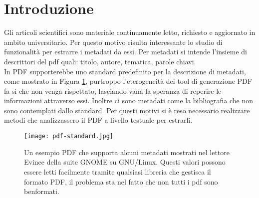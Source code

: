 \section{Introduzione}\label{intro}

Gli articoli scientifici sono materiale continuamente letto, richiesto e aggiornato in ambito universitario. Per questo motivo risulta interessante lo studio di funzionalità per estrarre i metadati da essi. Per metadati si intende l'insieme di descrittori del pdf quali: titolo, autore, tematica, parole chiavi.\\ In PDF supporterebbe uno standard predefinito per la descrizione di metadati, come mostrato in Figura \ref{fig:standard}, purtroppo l'eterogeneità dei tool di generazione PDF fa sì che non venga rispettato, lasciando vana la speranza di reperire le informazioni attraverso essi. Inoltre ci sono metadati come la bibliografia che non sono contemplati dallo standard. Per questi motivi si è reso necessario realizzare metodi che analizzassero il PDF a livello testuale per estrarli.\\

\begin{figure}[htb]
\begin{center}
\texttt{[image: pdf-standard.jpg]}
\end{center}
\caption[Un esempio PDF che supporta alcuni metadati]{Un esempio PDF che supporta alcuni metadati mostrati nel lettore Evince della suite GNOME su GNU/Linux. Questi valori possono essere letti facilmente tramite qualsiasi libreria che gestisca il formato PDF, il problema sta nel fatto che non tutti i pdf sono benformati.}
\label{fig:standard}
\end{figure}


